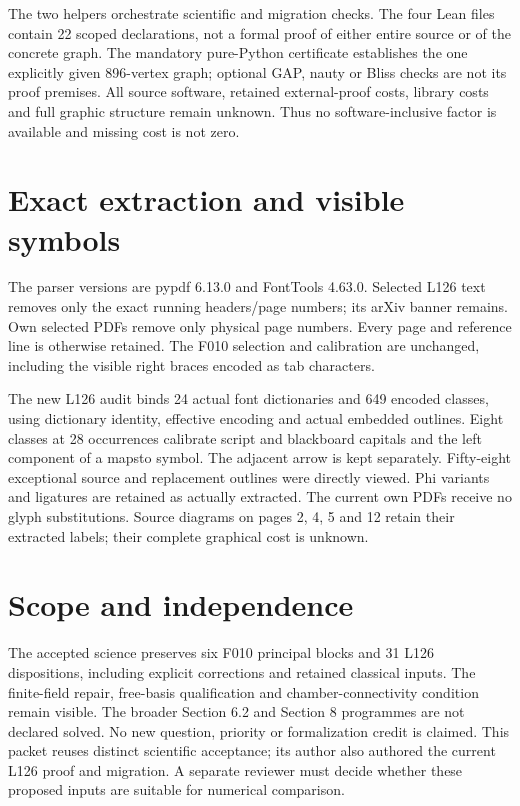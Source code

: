 \documentclass[11pt]{article}
\begin{document}
The two helpers orchestrate scientific and migration checks. The four Lean
files contain 22 scoped declarations, not a formal proof of either entire
source or of the concrete graph. The mandatory pure-Python certificate
establishes the one explicitly given 896-vertex graph; optional GAP, nauty or
Bliss checks are not its proof premises. All source software, retained
external-proof costs, library costs and full graphic structure remain unknown.
Thus no software-inclusive factor is available and missing cost is not zero.

\section*{Exact extraction and visible symbols}
The parser versions are pypdf 6.13.0 and FontTools 4.63.0. Selected L126 text
removes only the exact running headers/page numbers; its arXiv banner remains.
Own selected PDFs remove only physical page numbers. Every page and reference
line is otherwise retained. The F010 selection and calibration are unchanged,
including the visible right braces encoded as tab characters.

The new L126 audit binds 24 actual font dictionaries and 649 encoded classes,
using dictionary identity, effective encoding and actual embedded outlines.
Eight classes at 28 occurrences calibrate script and blackboard capitals and the
left component of a mapsto symbol. The adjacent arrow is kept separately.
Fifty-eight exceptional source and replacement outlines were directly viewed.
Phi variants and ligatures are retained as actually extracted. The current
own PDFs receive no glyph substitutions. Source diagrams on pages 2, 4, 5
and 12 retain their extracted labels; their complete graphical cost is unknown.

\section*{Scope and independence}
The accepted science preserves six F010 principal blocks and 31 L126
dispositions, including explicit corrections and retained classical inputs.
The finite-field repair, free-basis qualification and chamber-connectivity
condition remain visible. The broader Section 6.2 and Section 8 programmes
are not declared solved. No new question, priority or formalization credit is
claimed. This packet reuses distinct scientific acceptance; its author also
authored the current L126 proof and migration. A separate reviewer must decide
whether these proposed inputs are suitable for numerical comparison.
\end{document}
